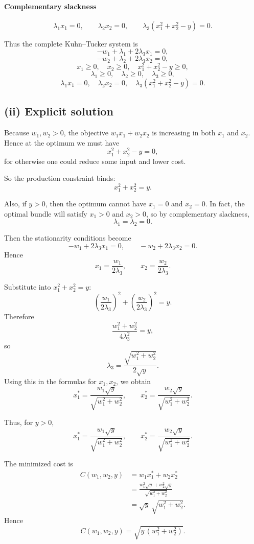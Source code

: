 \paragraph{Complementary slackness}
\[
\lambda_1x_1=0,\qquad \lambda_2x_2=0,\qquad \lambda_3(x_1^2+x_2^2-y)=0.
\]

Thus the complete Kuhn--Tucker system is
\[
-w_1+\lambda_1+2\lambda_3x_1=0,
\]
\[
-w_2+\lambda_2+2\lambda_3x_2=0,
\]
\[
x_1\ge 0,\quad x_2\ge 0,\quad x_1^2+x_2^2-y\ge 0,
\]
\[
\lambda_1\ge 0,\quad \lambda_2\ge 0,\quad \lambda_3\ge 0,
\]
\[
\lambda_1x_1=0,\quad \lambda_2x_2=0,\quad \lambda_3(x_1^2+x_2^2-y)=0.
\]

\subsection*{(ii) Explicit solution}

Because \(w_1,w_2>0\), the objective \(w_1x_1+w_2x_2\) is increasing in both \(x_1\) and \(x_2\). Hence at the optimum we must have
\[
x_1^2+x_2^2-y=0,
\]
for otherwise one could reduce some input and lower cost.

So the production constraint binds:
\[
x_1^2+x_2^2=y.
\]

Also, if \(y>0\), then the optimum cannot have \(x_1=0\) and \(x_2=0\). In fact, the optimal bundle will satisfy \(x_1>0\) and \(x_2>0\), so by complementary slackness,
\[
\lambda_1=\lambda_2=0.
\]

Then the stationarity conditions become
\[
-w_1+2\lambda_3x_1=0,
\qquad
-w_2+2\lambda_3x_2=0.
\]
Hence
\[
x_1=\frac{w_1}{2\lambda_3},
\qquad
x_2=\frac{w_2}{2\lambda_3}.
\]

Substitute into \(x_1^2+x_2^2=y\):
\[
\left(\frac{w_1}{2\lambda_3}\right)^2
+
\left(\frac{w_2}{2\lambda_3}\right)^2
=
y.
\]
Therefore
\[
\frac{w_1^2+w_2^2}{4\lambda_3^2}=y,
\]
so
\[
\lambda_3=\frac{\sqrt{w_1^2+w_2^2}}{2\sqrt{y}}.
\]
Using this in the formulas for \(x_1,x_2\), we obtain
\[
x_1^*
=
\frac{w_1\sqrt{y}}{\sqrt{w_1^2+w_2^2}},
\qquad
x_2^*
=
\frac{w_2\sqrt{y}}{\sqrt{w_1^2+w_2^2}}.
\]

Thus, for \(y>0\),
\[
\boxed{
x_1^*
=
\frac{w_1\sqrt{y}}{\sqrt{w_1^2+w_2^2}},
\qquad
x_2^*
=
\frac{w_2\sqrt{y}}{\sqrt{w_1^2+w_2^2}}.
}
\]

The minimized cost is
\[
\begin{aligned}
C(w_1,w_2,y)
&=
w_1x_1^*+w_2x_2^*\\
&=
\frac{w_1^2\sqrt{y}+w_2^2\sqrt{y}}{\sqrt{w_1^2+w_2^2}}\\
&=
\sqrt{y}\,\sqrt{w_1^2+w_2^2}.
\end{aligned}
\]
Hence
\[
\boxed{
C(w_1,w_2,y)=\sqrt{y\,(w_1^2+w_2^2)}.
}
\]

